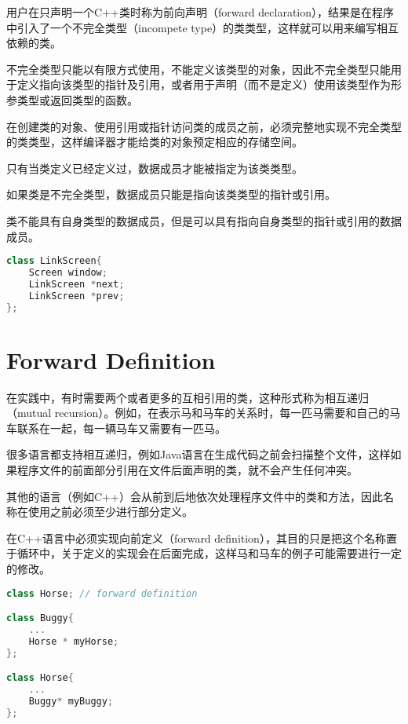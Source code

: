 用户在只声明一个C++类时称为前向声明（forward declaration），结果是在程序中引入了一个不完全类型（incompete type）的类类型，这样就可以用来编写相互依赖的类。

不完全类型只能以有限方式使用，不能定义该类型的对象，因此不完全类型只能用于定义指向该类型的指针及引用，或者用于声明（而不是定义）使用该类型作为形参类型或返回类型的函数。



在创建类的对象、使用引用或指针访问类的成员之前，必须完整地实现不完全类型的类类型，这样编译器才能给类的对象预定相应的存储空间。

\begin{compactitem}
\item 只有当类定义已经定义过，数据成员才能被指定为该类类型。
\item 如果类是不完全类型，数据成员只能是指向该类类型的指针或引用。
\end{compactitem}

类不能具有自身类型的数据成员，但是可以具有指向自身类型的指针或引用的数据成员。

\begin{lstlisting}[language=C++]
class LinkScreen{
	Screen window;
	LinkScreen *next;
	LinkScreen *prev;
};
\end{lstlisting}

\section{Forward Definition}

在实践中，有时需要两个或者更多的互相引用的类，这种形式称为相互递归（mutual recursion）。例如，在表示马和马车的关系时，每一匹马需要和自己的马车联系在一起，每一辆马车又需要有一匹马。

很多语言都支持相互递归，例如Java语言在生成代码之前会扫描整个文件，这样如果程序文件的前面部分引用在文件后面声明的类，就不会产生任何冲突。

其他的语言（例如C++）会从前到后地依次处理程序文件中的类和方法，因此名称在使用之前必须至少进行部分定义。


在C++语言中必须实现向前定义（forward definition），其目的只是把这个名称置于循环中，关于定义的实现会在后面完成，这样马和马车的例子可能需要进行一定的修改。

\begin{lstlisting}[language=C++]
class Horse; // forward definition

class Buggy{
	...
	Horse * myHorse;
};

class Horse{
	...
	Buggy* myBuggy;
};
\end{lstlisting}

